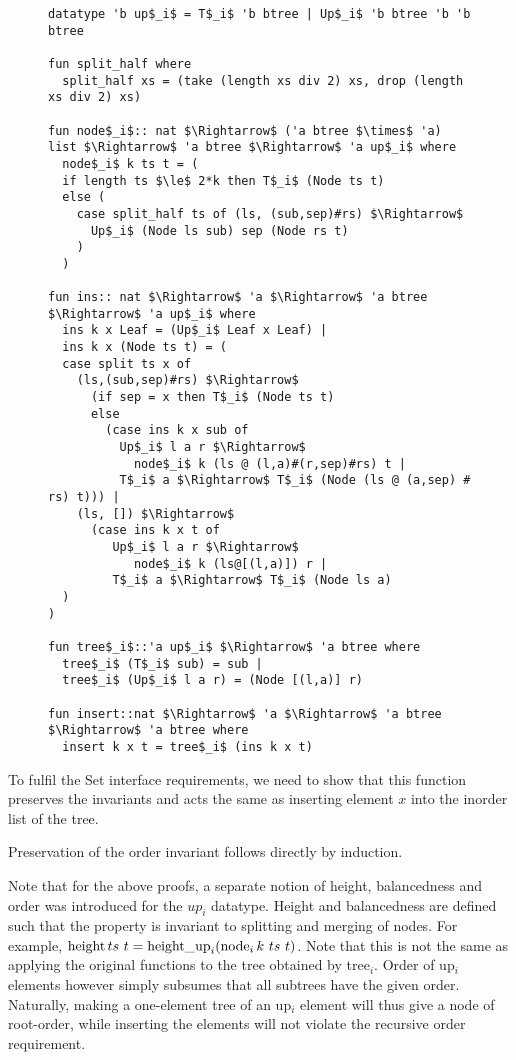 \begin{figure}
    
\begin{lstlisting}[mathescape=true, language=Isabelle, label=lst:ins-fun, caption={
    The \textit{insert} function
}]
datatype 'b up$_i$ = T$_i$ 'b btree | Up$_i$ 'b btree 'b 'b btree

fun split_half where
  split_half xs = (take (length xs div 2) xs, drop (length xs div 2) xs)

fun node$_i$:: nat $\Rightarrow$ ('a btree $\times$ 'a) list $\Rightarrow$ 'a btree $\Rightarrow$ 'a up$_i$ where
  node$_i$ k ts t = (
  if length ts $\le$ 2*k then T$_i$ (Node ts t)
  else (
    case split_half ts of (ls, (sub,sep)#rs) $\Rightarrow$
      Up$_i$ (Node ls sub) sep (Node rs t)
    )
  )

fun ins:: nat $\Rightarrow$ 'a $\Rightarrow$ 'a btree $\Rightarrow$ 'a up$_i$ where
  ins k x Leaf = (Up$_i$ Leaf x Leaf) |
  ins k x (Node ts t) = (
  case split ts x of
    (ls,(sub,sep)#rs) $\Rightarrow$ 
      (if sep = x then T$_i$ (Node ts t)
      else
        (case ins k x sub of 
          Up$_i$ l a r $\Rightarrow$
            node$_i$ k (ls @ (l,a)#(r,sep)#rs) t | 
          T$_i$ a $\Rightarrow$ T$_i$ (Node (ls @ (a,sep) # rs) t))) |
    (ls, []) $\Rightarrow$
      (case ins k x t of
         Up$_i$ l a r $\Rightarrow$
            node$_i$ k (ls@[(l,a)]) r |
         T$_i$ a $\Rightarrow$ T$_i$ (Node ls a)
  )
)

fun tree$_i$::'a up$_i$ $\Rightarrow$ 'a btree where
  tree$_i$ (T$_i$ sub) = sub |
  tree$_i$ (Up$_i$ l a r) = (Node [(l,a)] r)

fun insert::nat $\Rightarrow$ 'a $\Rightarrow$ 'a btree $\Rightarrow$ 'a btree where
  insert k x t = tree$_i$ (ins k x t)
\end{lstlisting}

\end{figure}

To fulfil the Set interface requirements,
we need to show that this function preserves the invariants
and acts the same as inserting element $x$ into the inorder list of the tree.

Preservation of the order invariant follows directly by induction.

Note that for the above proofs, a separate notion of height, balancedness and order
was introduced for the $up_i$ datatype.
Height and balancedness are
defined such that the property is invariant to splitting and merging of nodes.
For example, $\height ts\ t = \heightup_i (\node_i k\ ts\ t)$.
Note that this is not the same as applying the original functions
to the tree obtained by tree$_i$.
Order of up$_i$ elements however simply subsumes that all subtrees have
the given order.
Naturally, making a one-element tree of an up$_i$ element will thus
give a node of root-order, while inserting the elements
will not violate the recursive order requirement.

